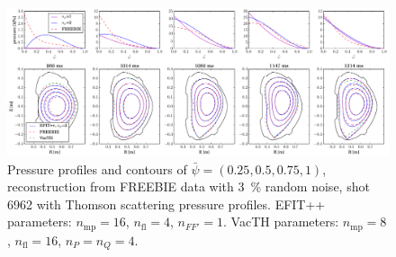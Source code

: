 \begin{figure}
\centering   %
\hfill{}
\includegraphics[width=18cm]{figures/example_6962_TS_noise.pdf}
\hfill{}
\caption{Pressure profiles and contours of $\bar\psi=\left(0.25,0.5,0.75,1\right)$, reconstruction from FREEBIE data with 3~\% random noise, shot 6962 with Thomson scattering pressure profiles. EFIT++ parameters: $n_\mathrm{mp} = 16$, $n_\mathrm{fl} = 4$, $n_{FF'} = 1$. VacTH parameters: $n_\mathrm{mp} = 8$, $n_\mathrm{fl} = 16$, $n_P = n_Q = 4$.}
\label{fig:ex6962}
\end{figure}

